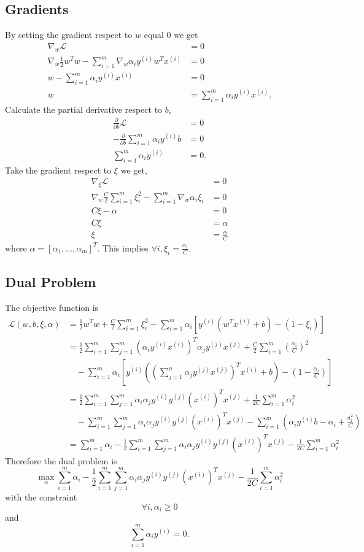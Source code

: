 \documentclass{article}
\begin{document}
\subsection{Gradients}
By setting the gradient respect to $w$ equal 0 we get
\begin{align*}
\nabla_w\mathcal{L}&=0 \\
\nabla_w\frac{1}{2}w^Tw-\sum_{i=1}^m \nabla_w\alpha_iy^{(i)}w^Tx^{(i)}&=0 \\
w-\sum_{i=1}^m\alpha_iy^{(i)}x^{(i)}&=0 \\
w&=\sum_{i=1}^m\alpha_iy^{(i)}x^{(i)}.
\end{align*}
Calculate the partial derivative respect to $b$,
\begin{align*}
\frac{\partial}{\partial b}\mathcal{L}&=0 \\
-\frac{\partial}{\partial b}\sum_{i=1}^m\alpha_iy^{(i)}b&=0 \\
\sum_{i=1}^m\alpha_iy^{(i)}&=0.
\end{align*}
Take the gradient respect to $\xi$ we get,
\begin{align*}
\nabla_\xi\mathcal{L}&=0 \\
\nabla_w\frac{C}{2}\sum_{i=1}^m\xi_i^2-\sum_{i=1}^m \nabla_w\alpha_i\xi_i&=0 \\
C\xi-\alpha&=0 \\
C\xi&=\alpha \\
\xi&=\frac{\alpha}{C}
\end{align*}
where $\alpha=[\alpha_1,\ldots,\alpha_m]^T$. This implies $\forall i, \xi_i=\frac{\alpha_i}{C}$.

\subsection{Dual Problem}
The objective function is
\begin{align*}
\mathcal{L}(w,b,\xi,\alpha) &=\frac{1}{2}w^Tw+\frac{C}{2}\sum_{i=1}^m\xi_i^2 -\sum_{i=1}^m\alpha_i[y^{(i)}(w^Tx^{(i)}+b)-(1-\xi_i)] \\
&=\frac{1}{2}\sum_{i=1}^m\sum_{j=1}^m(\alpha_iy^{(i)}x^{(i)})^T \alpha_jy^{(j)}x^{(j)}+ \frac{C}{2}\sum_{i=1}^m(\frac{\alpha_i}{C})^2 \\ &\quad-\sum_{i=1}^m\alpha_i[y^{(i)}((\sum_{j=1}^n\alpha_jy^{(j)}x^{(j)})^Tx^{(i)}+b)-(1-\frac{\alpha_i}{C})] \\
&=\frac{1}{2}\sum_{i=1}^m\sum_{j=1}^m\alpha_i\alpha_jy^{(i)} y^{(j)}(x^{(i)})^Tx^{(j)}+\frac{1}{2C}\sum_{i=1}^m\alpha_i^2 \\
&\quad-\sum_{i=1}^m\sum_{j=1}^m\alpha_i\alpha_jy^{(i)} y^{(j)}(x^{(i)})^T x^{(j)}-\sum_{i=1}^m(\alpha_iy^{(i)}b-\alpha_i+\frac{a_i^2}{C}) \\
&=\sum_{i=1}^m\alpha_i-\frac{1}{2}\sum_{i=1}^m\sum_{j=1}^m\alpha_i \alpha_jy^{(i)}y^{(j)}(x^{(i)})^Tx^{(j)}- \frac{1}{2C}\sum_{i=1}^m\alpha_i^2
\end{align*}
Therefore the dual problem is $$\max_\alpha \sum_{i=1}^m\alpha_i-\frac{1}{2}\sum_{i=1}^m\sum_{j=1}^m\alpha_i \alpha_jy^{(i)}y^{(j)}(x^{(i)})^Tx^{(j)}- \frac{1}{2C}\sum_{i=1}^m\alpha_i^2$$ with the constraint $$\forall i,\alpha_i\ge0$$ and $$\sum_{i=1}^m\alpha_iy^{(i)}=0.$$
\end{document}
